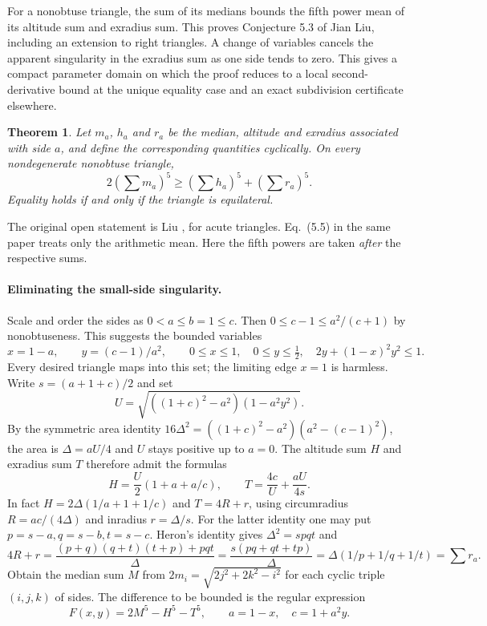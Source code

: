\documentclass[11pt,a4paper]{article}
\numberwithin{equation}{section}
\newtheorem{theorem}{Theorem}[section]
\theoremstyle{definition}
\theoremstyle{remark}
\newenvironment{sectionabstract}{\par\smallskip\begingroup\small\noindent}{\par\endgroup\medskip}
\begin{document}
\begin{sectionabstract}
For a nonobtuse triangle, the sum of its medians bounds the fifth power mean of its altitude sum and exradius sum. This proves Conjecture 5.3 of Jian Liu, including an extension to right triangles. A change of variables cancels the apparent singularity in the exradius sum as one side tends to zero. This gives a compact parameter domain on which the proof reduces to a local second-derivative bound at the unique equality case and an exact subdivision certificate elsewhere.
\end{sectionabstract}

\begin{theorem}
Let $m_a$, $h_a$ and $r_a$ be the median, altitude and exradius associated with side $a$, and define the corresponding quantities cyclically. On every nondegenerate nonobtuse triangle,
\[
 2\left(\sum m_a\right)^5\ge
 \left(\sum h_a\right)^5+\left(\sum r_a\right)^5 .
\]
Equality holds if and only if the triangle is equilateral.
\end{theorem}
The original open statement is Liu \cite[p.~78, Conjecture 5.3, Eq.~(5.6)]{r35meiji:liu}, for acute triangles. Eq.~(5.5) in the same paper treats only the arithmetic mean. Here the fifth powers are taken \emph{after} the respective sums.

\paragraph{Eliminating the small-side singularity.}
Scale and order the sides as $0<a\le b=1\le c$. Then $0\le c-1\le a^2/(c+1)$ by nonobtuseness. This suggests the bounded variables
\[
 x=1-a,\qquad y=(c-1)/a^2,\qquad
 0\le x\le1,\quad 0\le y\le\tfrac12,\quad
 2y+(1-x)^2y^2\le1 .
\]
Every desired triangle maps into this set; the limiting edge $x=1$ is harmless. Write $s=(a+1+c)/2$ and set
\[
 U=\sqrt{((1+c)^2-a^2)(1-a^2y^2)} .
\]
By the symmetric area identity $16\Delta^2=((1+c)^2-a^2)(a^2-(c-1)^2)$, the area is $\Delta=aU/4$ and $U$ stays positive up to $a=0$. The altitude sum $H$ and exradius sum $T$ therefore admit the formulas
\[
 H=\frac{U}{2}(1+a+a/c),\qquad
 T=\frac{4c}{U}+\frac{aU}{4s}.
\]
In fact $H=2\Delta(1/a+1+1/c)$ and $T=4R+r$, using circumradius $R=ac/(4\Delta)$ and inradius $r=\Delta/s$. For the latter identity one may put $p=s-a,q=s-b,t=s-c$. Heron's identity gives
$\Delta^2=spqt$ and
\[
 4R+r=\frac{(p+q)(q+t)(t+p)+pqt}{\Delta}
      =\frac{s(pq+qt+tp)}{\Delta}
      =\Delta(1/p+1/q+1/t)=\sum r_a .
\]
Obtain the median sum $M$ from $2m_i=\sqrt{2j^2+2k^2-i^2}$ for each cyclic triple $(i,j,k)$ of sides. The difference to be bounded is the regular expression
\[
 F(x,y)=2M^5-H^5-T^5,\qquad a=1-x,\quad c=1+a^2y .
\]
\end{document}
